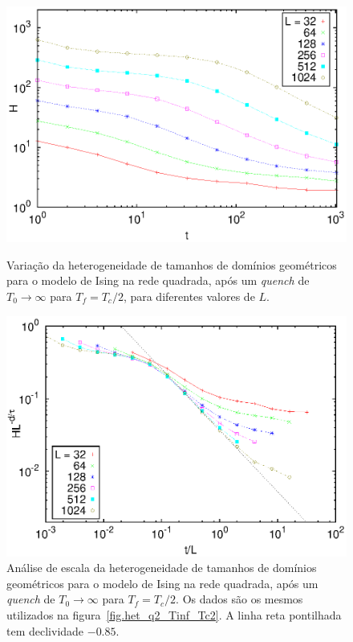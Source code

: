 \begin{figure}[p]
 \centering
 \includegraphics[width=14cm]{fig/het_q2_Tinf_Tc2.eps}
 \caption{Variação da heterogeneidade de tamanhos de domínios geométricos para o modelo de Ising na rede quadrada, após um \textit{quench} de $T_0\rightarrow \infty$ para $T_f=T_c/2$, para diferentes valores de $L$.}
\label{fig.het_q2_Tinf_Tc2}
\vspace{8mm}
 \includegraphics[width=14cm]{fig/het_q2_Tinf_Tc2_colXY.eps}
 \caption{Análise de escala da heterogeneidade de tamanhos de domínios geométricos para o modelo de Ising na rede quadrada, após um \textit{quench} de $T_0\rightarrow \infty$ para $T_f=T_c/2$. Os dados são os mesmos utilizados na figura~\ref{fig.het_q2_Tinf_Tc2}. A linha reta pontilhada tem declividade $-0.85$.}
\label{fig.het_q2_Tinf_Tc2_colXY}
\end{figure}


